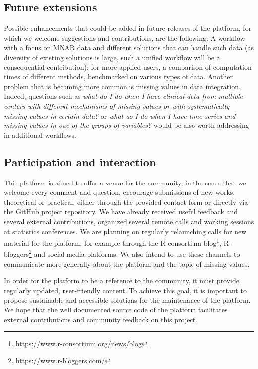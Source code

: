 \subsection{Future extensions}

Possible enhancements that could be added in future releases of the platform, for which we welcome suggestions and contributions, are the following: A workflow with a focus on MNAR data and different solutions that can handle such data (as diversity of existing solutions is large, such a unified workflow will be a consequential contribution); for more applied users, a comparison of computation times of different methods, benchmarked on various types of data. 
Another problem that is becoming more common is missing values in data integration. Indeed, questions such as \textit{what do I do when I have clinical data from multiple centers with different mechanisms of missing values or with systematically missing values in certain data?} or \textit{what do I do when I have time series and missing values in one of the groups of variables?} would be also worth addressing in additional workflows.


\subsection{Participation and interaction}


This platform is aimed to offer a venue for the community, in the sense that we welcome
every comment and question, encourage submissions of new works, theoretical or
practical, either through the provided contact form or directly via the GitHub
project repository. We
have already received useful feedback and several external contributions, organized several remote
calls and working sessions at statistics conferences. We are
planning on regularly relaunching calls for new material for the platform, for example through the R consortium
blog\footnote{\url{https://www.r-consortium.org/news/blog}},
R-bloggers\footnote{\url{https://www.r-bloggers.com/}} and social media
platforms. We also intend to use these channels to communicate more generally
about the platform and the topic of missing values.


In order for the platform to be a reference to the community, it must 
provide regularly updated, user-friendly content. To achieve this goal, it is important to propose sustainable and accessible solutions for the maintenance of the  platform. We hope that the well documented source code of the platform facilitates external contributions and community feedback on this project.


